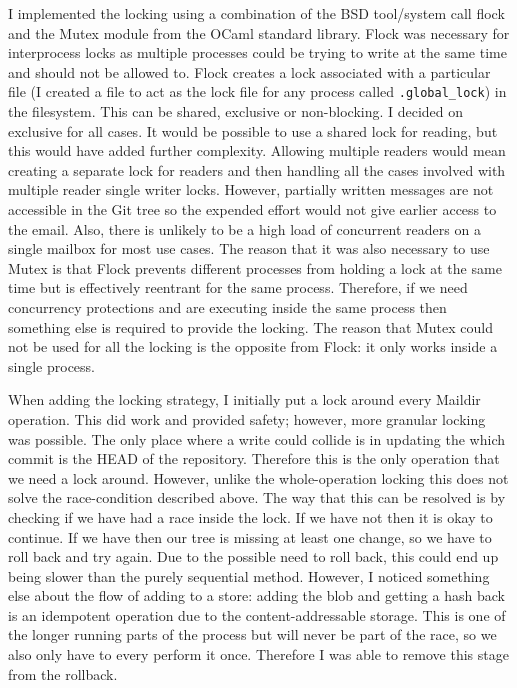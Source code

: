 I implemented the locking using a combination of the BSD tool/system call flock\cite{manual_flock} and the Mutex module from the OCaml standard library. Flock was necessary for interprocess locks as multiple processes could be trying to write at the same time and should not be allowed to. Flock creates a lock associated with a particular file (I created a file to act as the lock file for any process called \texttt{.global\_lock}) in the filesystem. This can be shared, exclusive or non-blocking. I decided on exclusive for all cases. It would be possible to use a shared lock for reading, but this would have added further complexity. Allowing multiple readers would mean creating a separate lock for readers and then handling all the cases involved with multiple reader single writer locks. However, partially written messages are not accessible in the Git tree so the expended effort would not give earlier access to the email. Also, there is unlikely to be a high load of concurrent readers on a single mailbox for most use cases. The reason that it was also necessary to use Mutex is that Flock prevents different processes from holding a lock at the same time but is effectively reentrant for the same process. Therefore, if we need concurrency protections and are executing inside the same process then something else is required to provide the locking. The reason that Mutex could not be used for all the locking is the opposite from Flock: it only works inside a single process.

When adding the locking strategy, I initially put a lock around every Maildir operation. This did work and provided safety; however, more granular locking was possible. The only place where a write could collide is in updating the which commit is the HEAD of the repository. Therefore this is the only operation that we need a lock around. However, unlike the whole-operation locking this does not solve the race-condition described above. The way that this can be resolved is by checking if we have had a race inside the lock. If we have not then it is okay to continue. If we have then our tree is missing at least one change, so we have to roll back and try again. Due to the possible need to roll back, this could end up being slower than the purely sequential method. However, I noticed something else about the flow of adding to a store: adding the blob and getting a hash back is an idempotent operation due to the content-addressable storage. This is one of the longer running parts of the process but will never be part of the race, so we also only have to every perform it once. Therefore I was able to remove this stage from the rollback.

